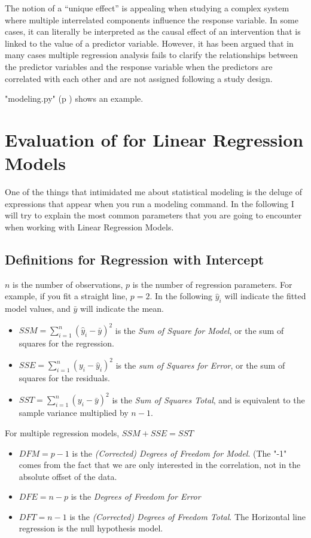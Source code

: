 The notion of a “unique effect” is appealing when studying a complex system where multiple interrelated components influence the response variable. In some cases, it can literally be interpreted as the causal effect of an intervention that is linked to the value of a predictor variable. However, it has been argued that in many cases multiple regression analysis fails to clarify the relationships between the predictor variables and the response variable when the predictors are correlated with each other and are not assigned following a study design.

\PyImg "modeling.py" (p \pageref{py:modeling}) shows an example.

\section{Evaluation of for Linear Regression Models}

One of the things that intimidated me about statistical modeling is the
deluge of expressions that appear when you run a modeling command. In the
following I will try to explain the most common parameters that you are
going to encounter when working with Linear Regression Models.


\subsection{Definitions for Regression with Intercept}

$n$ is the number of observations, $p$ is the number of regression parameters. For example, if you fit a straight line, $p=2$.
In the following $\hat{y}_i$ will indicate the fitted model values, and $\bar{y}$ will indicate the mean.

\begin{itemize}
  \item $SSM = \sum_{i=1}^n (\hat{y}_i-\bar{y})^2$ is the \emph{Sum of Square for Model}, or the sum of squares for the regression.
  \item $SSE = \sum_{i=1}^n (y_i-\hat{y}_i)^2$ is the \emph{sum of Squares for Error}, or the sum of squares for the residuals.
  \item $SST = \sum_{i=1}^n (y_i-\bar{y})^2$ is the \emph{Sum of Squares Total}, and is equivalent to the sample variance multiplied by $n-1$.
\end{itemize}

For multiple regression models, $SSM + SSE = SST$

\begin{itemize}
  \item $DFM = p - 1$ is the \emph{(Corrected) Degrees of Freedom for Model}. (The "-1" comes from the fact that we are only interested in the correlation, not in the absolute offset of the data.
  \item $DFE = n - p$ is the \emph{Degrees of Freedom for Error}
  \item $DFT = n - 1$ is the \emph{(Corrected) Degrees of Freedom Total}. The Horizontal line regression is the null hypothesis model.
\end{itemize}

